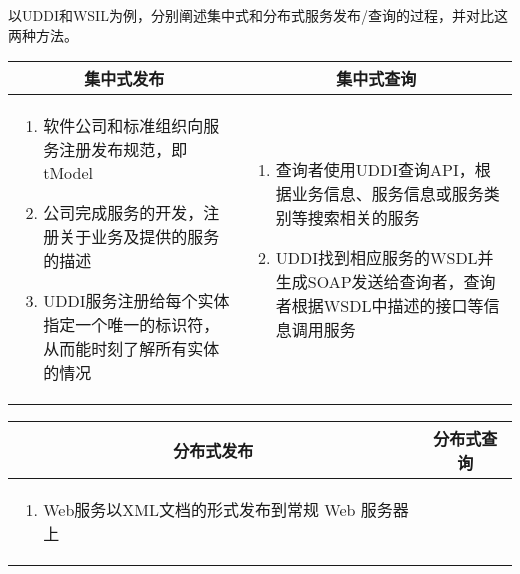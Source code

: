 \begin{problem}
以UDDI和WSIL为例，分别阐述集中式和分布式服务发布/查询的过程，并对比这两种方法。
\end{problem}

\begin{solution}
\begin{spacing}{1.2}
    \vspace{-0.5em}
    \begin{longtable}{|m{7.5cm}|m{7.5cm}|}
        \hline
        \multicolumn{1}{|c|}{\textbf{集中式发布}} & \multicolumn{1}{c|}{\textbf{集中式查询}} \\ \hline
        \vspace{-1.1em}
        \begin{enumerate}[label=\arabic*.,leftmargin=1.5em,itemsep=-3pt]
            \item 软件公司和标准组织向服务注册发布规范，即tModel
            \item 公司完成服务的开发，注册关于业务及提供的服务的描述
            \item UDDI服务注册给每个实体指定一个唯一的标识符，从而能时刻了解所有实体的情况
        \vspace{-1.3em}
        \end{enumerate}                                           
        & 
        \vspace{-1.1em}
        \begin{enumerate}[label=\arabic*.,leftmargin=1.5em,itemsep=-3pt]
            \item 查询者使用UDDI查询API，根据业务信息、服务信息或服务类别等搜索相关的服务
            \item UDDI找到相应服务的WSDL并生成SOAP发送给查询者，查询者根据WSDL中描述的接口等信息调用服务
        \vspace{-1.3em}
        \end{enumerate}
        \\ \hline
    \end{longtable}
    \vspace{-1em}
    \begin{longtable}{|m{7.5cm}|m{7.5cm}|} 
        \hline
        \multicolumn{1}{|c|}{\textbf{分布式发布}} & \multicolumn{1}{c|}{\textbf{分布式查询}} \\ \hline
        \vspace{-1.1em}
        \begin{enumerate}[label=\arabic*.,leftmargin=1.5em,itemsep=-3pt]
            \item Web服务以XML文档的形式发布到常规 Web 服务器上

\end{enumerate}
\end{longtable}
\end{spacing}
\end{solution}
